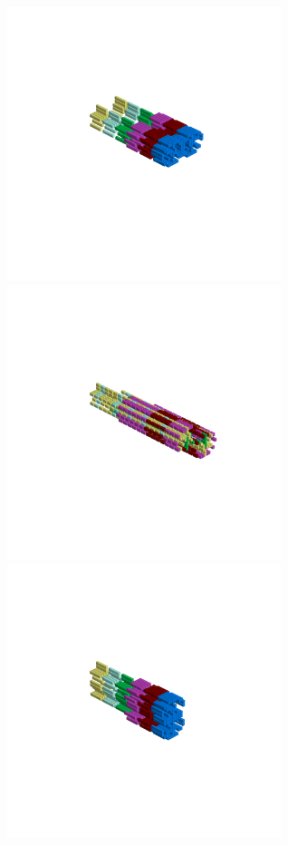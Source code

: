 \begin{minipage}[b]{0.50\linewidth}                                       
  \begin{figure}[H]
      \centering
        \vspace*{-1cm}
        \hspace*{-2cm}
        \includegraphics[width=8cm]{src/symmetries/pattern8_1-45.png}%
        \hspace*{-4cm}
        \includegraphics[width=8cm]{src/symmetries/pattern8_2-45.png}\\
        \vspace*{-5cm}
        \hspace*{-3cm}
        \includegraphics[width=8cm]{src/symmetries/pattern8_3-45.png}\\

\end{figure}
\end{minipage}
